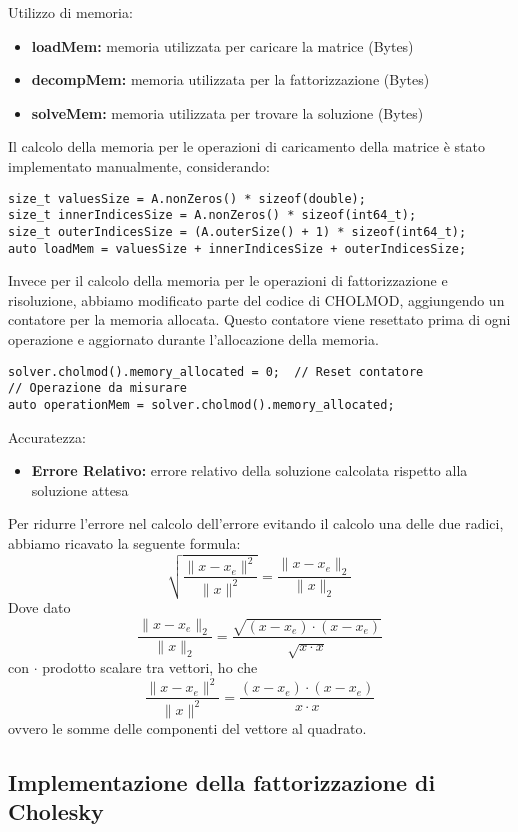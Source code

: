 Utilizzo di memoria:
\begin{itemize}
    \item \textbf{loadMem:} memoria utilizzata per caricare la matrice (Bytes)
    \item \textbf{decompMem:} memoria utilizzata per la fattorizzazione (Bytes)
    \item \textbf{solveMem:} memoria utilizzata per trovare la soluzione (Bytes)
\end{itemize}

Il calcolo della memoria per le operazioni di caricamento della matrice è stato implementato manualmente, considerando:
\begin{verbatim}
size_t valuesSize = A.nonZeros() * sizeof(double);
size_t innerIndicesSize = A.nonZeros() * sizeof(int64_t);
size_t outerIndicesSize = (A.outerSize() + 1) * sizeof(int64_t);
auto loadMem = valuesSize + innerIndicesSize + outerIndicesSize;
\end{verbatim}

Invece per il calcolo della memoria per le operazioni di fattorizzazione e risoluzione, abbiamo modificato parte del codice di CHOLMOD, 
aggiungendo un contatore per la memoria allocata. Questo contatore viene resettato prima di ogni operazione e 
aggiornato durante l'allocazione della memoria.

\begin{verbatim}
solver.cholmod().memory_allocated = 0;  // Reset contatore
// Operazione da misurare
auto operationMem = solver.cholmod().memory_allocated;
\end{verbatim}

Accuratezza:
\begin{itemize}
    \item \textbf{Errore Relativo:} errore relativo della soluzione calcolata rispetto alla soluzione attesa
\end{itemize}

Per ridurre l'errore nel calcolo dell'errore evitando il calcolo una delle due radici, abbiamo ricavato la seguente formula: \[\sqrt{ \frac{ \| x - x_e \|^2 }{ \| x \|^2 } } = \frac{ \| x - x_e \|_2 }{ \| x \|_2 }\]
Dove dato \[\frac{ \| x - x_e \|_2 }{ \| x \|_2 } = \frac{\sqrt{(x - x_e)\cdot(x - x_e)}}{\sqrt{x \cdot x}}\] con \(\cdot\) prodotto scalare tra vettori, ho che \[\frac{\| x - x_e \|^2}{\| x \|^2} = \frac{(x - x_e)\cdot(x - x_e)}{x \cdot x}\] ovvero le somme delle componenti del vettore al quadrato.

\subsection{Implementazione della fattorizzazione di Cholesky}

